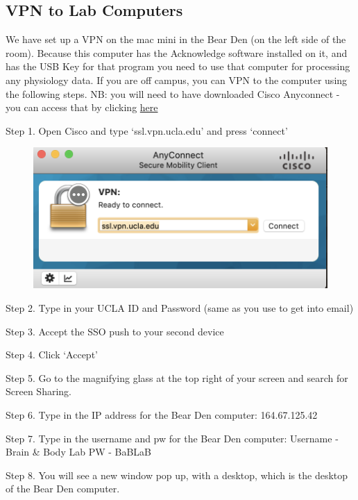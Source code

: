 \documentclass[]{book}
\begin{document}
\hypertarget{vpn-to-lab-computers}{%
\subsection{VPN to Lab Computers}\label{vpn-to-lab-computers}}

We have set up a VPN on the mac mini in the Bear Den (on the left side of the room).
Because this computer has the Acknowledge software installed on it, and has the USB Key for that program you need to use that computer for processing any physiology data. If you are off campus, you can VPN to the computer using the following steps. NB: you will need to have downloaded Cisco Anyconnect - you can access that by clicking \href{https://www.it.ucla.edu/it-support-center/services/virtual-private-network-vpn-clients}{here}

Step 1. Open Cisco and type `ssl.vpn.ucla.edu' and press `connect'

\begin{figure}
\centering
\includegraphics{images/lab_protocols/cisco/1.png}
\caption{}
\end{figure}

Step 2. Type in your UCLA ID and Password (same as you use to get into email)

Step 3. Accept the SSO push to your second device

Step 4. Click `Accept'

Step 5. Go to the magnifying glass at the top right of your screen and search for Screen Sharing.

Step 6. Type in the IP address for the Bear Den computer: 164.67.125.42

Step 7. Type in the username and pw for the Bear Den computer:
Username - Brain \& Body Lab
PW - BaBLaB

Step 8. You will see a new window pop up, with a desktop, which is the desktop of the Bear Den computer.
\end{document}
